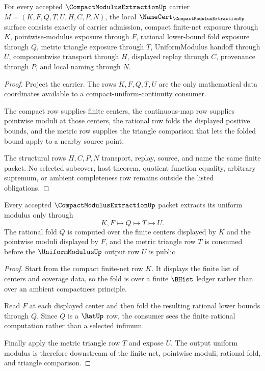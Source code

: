 \begin{theorem}
\label{thm:compact-modulus-extraction-namecert-obligations}
For every accepted $\CompactModulusExtractionUp$ carrier $M=(K,F,Q,T,U,H,C,P,N)$, the local $\NameCert_{\CompactModulusExtractionUp}$ surface consists exactly of carrier admission, compact finite-net exposure through $K$, pointwise-modulus exposure through $F$, rational lower-bound fold exposure through $Q$, metric triangle exposure through $T$, UniformModulus handoff through $U$, componentwise transport through $H$, displayed replay through $C$, provenance through $P$, and local naming through $N$.
\end{theorem}
\begin{proof}
Project the carrier. The rows $K,F,Q,T,U$ are the only mathematical data coordinates available to a compact-uniform-continuity consumer.

The compact row supplies finite centers, the continuous-map row supplies pointwise moduli at those centers, the rational row folds the displayed positive bounds, and the metric row supplies the triangle comparison that lets the folded bound apply to a nearby source point.

The structural rows $H,C,P,N$ transport, replay, source, and name the same finite packet. No selected subcover, host theorem, quotient function equality, arbitrary supremum, or ambient completeness row remains outside the listed obligations.
\end{proof}

\begin{theorem}
\label{thm:compact-modulus-extraction-finite-net-fold}
Every accepted $\CompactModulusExtractionUp$ packet extracts its uniform modulus only through
$$
K,F\longmapsto Q\longmapsto T\longmapsto U .
$$
The rational fold $Q$ is computed over the finite centers displayed by $K$ and the pointwise moduli displayed by $F$, and the metric triangle row $T$ is consumed before the $\UniformModulusUp$ output row $U$ is public.
\end{theorem}
\begin{proof}
Start from the compact finite-net row $K$. It displays the finite list of centers and coverage data, so the fold is over a finite $\BHist$ ledger rather than over an ambient compactness principle.

Read $F$ at each displayed center and then fold the resulting rational lower bounds through $Q$. Since $Q$ is a $\RatUp$ row, the consumer sees the finite rational computation rather than a selected infimum.

Finally apply the metric triangle row $T$ and expose $U$. The output uniform modulus is therefore downstream of the finite net, pointwise moduli, rational fold, and triangle comparison.
\end{proof}

